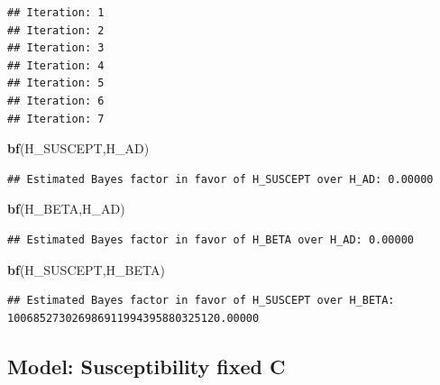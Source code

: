\documentclass[
]{article}
\newenvironment{Shaded}{\begin{snugshade}}{\end{snugshade}}
\newcommand{\KeywordTok}[1]{\textcolor[rgb]{0.13,0.29,0.53}{\textbf{#1}}}
\newcommand{\NormalTok}[1]{#1}
\begin{document}
\begin{verbatim}
## Iteration: 1
## Iteration: 2
## Iteration: 3
## Iteration: 4
## Iteration: 5
## Iteration: 6
## Iteration: 7
\end{verbatim}

\begin{Shaded}
\begin{Highlighting}[]
\KeywordTok{bf}\NormalTok{(H_SUSCEPT,H_AD)}
\end{Highlighting}
\end{Shaded}

\begin{verbatim}
## Estimated Bayes factor in favor of H_SUSCEPT over H_AD: 0.00000
\end{verbatim}

\begin{Shaded}
\begin{Highlighting}[]
\KeywordTok{bf}\NormalTok{(H_BETA,H_AD)}
\end{Highlighting}
\end{Shaded}

\begin{verbatim}
## Estimated Bayes factor in favor of H_BETA over H_AD: 0.00000
\end{verbatim}

\begin{Shaded}
\begin{Highlighting}[]
\KeywordTok{bf}\NormalTok{(H_SUSCEPT,H_BETA)}
\end{Highlighting}
\end{Shaded}

\begin{verbatim}
## Estimated Bayes factor in favor of H_SUSCEPT over H_BETA: 100685273026986911994395880325120.00000
\end{verbatim}

\hypertarget{model-susceptibility-fixed-c}{%
\subsection{Model: Susceptibility fixed
C}\label{model-susceptibility-fixed-c}}
\end{document}
